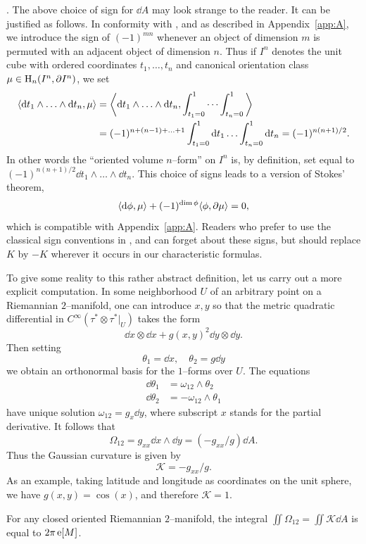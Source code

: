 \documentclass[../main]{subfiles}
\begin{document}
. The above choice of sign for $\dd A$ may look strange to the reader. It can be justified as follows. In conformity with \cite{maclane_1975}, and as described in Appendix~\ref{app:A}, we introduce the sign of $(-1)^{mn}$ whenever an object of dimension $m$ is permuted with an adjacent object of dimension $n$. Thus if $I^n$ denotes the unit cube with ordered coordinates $t_1, \ldots, t_n$ and canonical orientation class $\mu \in \operatorname{H}_n(I^n, \partial I^n)$, we set 
\begin{align*}
\langle\mathrm{d} t_1 \wedge \ldots \wedge \mathrm{d} t_n,\mu\rangle & = \bigg\langle\mathrm{d} t_1 \wedge \ldots \wedge \mathrm{d} t_n,\int_{t_1 = 0}^1 \cdots \int_{t_n = 0}^1\bigg\rangle \\ & = (-1)^{n + (n - 1) + \ldots + 1} \int_{t_1 = 0}^1 \mathrm{d} t_1 \ldots \int_{t_n = 0}^1 \mathrm{d} t_n = (-1)^{n(n + 1)/2}.
\end{align*}
In other words the ``oriented volume $n$--form'' on $I^n$ is, by definition, set equal to $(-1)^{n(n + 1)/2} \dd t_1 \wedge \ldots \wedge \dd t_n$. This choice of signs leads to a version of Stokes' theorem, \[\langle\mathrm{d} \phi,\mu\rangle + (-1)^{\dim \phi} \langle\phi,\partial \mu\rangle = 0,\] which is compatible with Appendix~\ref{app:A}. Readers who prefer to use the classical sign conventions in \cite{spanier1981}, \cite{warner2013foundations} and \cite{bott-chern} can forget about these signs, but should replace $K$ by $-K$ wherever it occurs in our characteristic formulas. 

 To give some reality to this rather abstract definition, let us carry out a more explicit computation. In some neighborhood $U$ of an arbitrary point on a Riemannian $2$--manifold, one can introduce  $x, y$ so that the metric quadratic differential in $C^\infty(\tau^\ast \otimes \tau^\ast|_U)$ takes the form 
 \[\dd x \otimes \dd x + g(x, y)^2 \dd y \otimes \dd y.\] Then setting \[\theta_1 = \dd x, \quad \theta_2 = g \dd y\] we obtain an orthonormal basis for the $1$--forms over $U$. The equations
\begin{align*}
\dd  \theta_1 & = \omega_{12} \wedge \theta_2 \\ \dd  \theta_2 & = -\omega_{12} \wedge \theta_1
\end{align*}
have unique solution $\omega_{12} = g_x \dd y$, where subscript $x$ stands for the partial derivative. It follows that \[\Omega_{12} = g_{xx} \dd x \wedge \dd y = (-g_{xx}/g) \dd A.\] Thus the Gaussian curvature is given by \[\mathcal K = -g_{xx}/g.\] As an example, taking latitude and longitude as coordinates on the unit sphere, we have $g(x, y) = \cos(x)$, and therefore $\mathcal K = 1$. 
\begin{theorem*}
For any closed oriented Riemannian $2$--manifold, the integral $\iint \Omega_{12} = \iint \mathcal K \dd A$ is equal to $2 \pi \operatorname{e}[M]$.
\end{theorem*}
\end{document}
